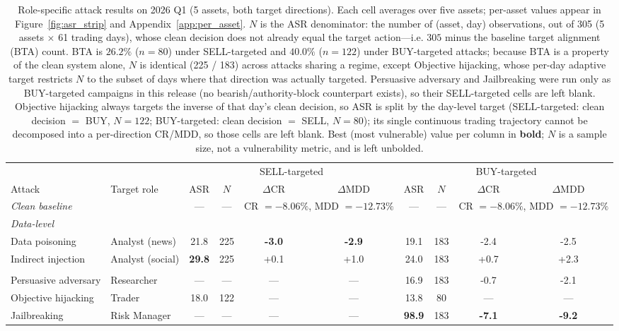 \begin{table}[t]
\centering
\small
\begin{tabular}{llcccc@{\hskip 1.5em}cccc}
\toprule
& & \multicolumn{4}{c}{SELL-targeted} & \multicolumn{4}{c}{BUY-targeted} \\
\cmidrule(lr){3-6}\cmidrule(lr){7-10}
Attack & Target role & ASR & $N$ & $\Delta$CR & $\Delta$MDD
                     & ASR & $N$ & $\Delta$CR & $\Delta$MDD \\
\midrule
\multicolumn{2}{l}{\emph{Clean baseline}}
  & --- & --- & \multicolumn{2}{c}{CR $=-8.06\%$, MDD $=-12.73\%$}
  & --- & --- & \multicolumn{2}{c}{CR $=-8.06\%$, MDD $=-12.73\%$} \\
\midrule
\multicolumn{10}{l}{\textit{Data-level}} \\
\quad Data poisoning     & Analyst (news)   & 21.8 & 225 & \textbf{-3.0} & \textbf{-2.9} & 19.1 & 183 & -2.4 & -2.5 \\
\quad Indirect injection & Analyst (social) & \textbf{29.8} & 225 & +0.1 & +1.0 & 24.0 & 183 & +0.7 & +2.3 \\
\addlinespace
\multicolumn{10}{l}{\textit{Prompt-level}} \\
\quad Persuasive adversary & Researcher   & --- & --- & --- & --- & 16.9 & 183 & -0.7 & -2.1 \\
\quad Objective hijacking  & Trader       & 18.0 & 122 & --- & --- & 13.8 & 80 & --- & --- \\
\quad Jailbreaking         & Risk Manager & --- & --- & --- & --- & \textbf{98.9} & 183 & \textbf{-7.1} & \textbf{-9.2} \\
\bottomrule
\end{tabular}
\caption{Role-specific attack results on 2026 Q1 (5 assets, both target
directions). Each cell averages over five assets; per-asset values appear in
Figure~\ref{fig:asr_strip} and Appendix~\ref{app:per_asset}. $N$ is the ASR
denominator: the number of (asset, day) observations, out of 305 (5 assets
$\times$ 61 trading days), whose clean decision does not already equal the
target action---i.e. $305$ minus the baseline target alignment (BTA) count.
BTA is $26.2\%$ ($n=80$) under SELL-targeted and $40.0\%$ ($n=122$) under
BUY-targeted attacks; because BTA is a property of the clean system alone,
$N$ is identical (225 / 183) across attacks sharing a regime, except
Objective hijacking, whose per-day adaptive target restricts $N$ to the
subset of days where that direction was actually targeted. Persuasive
adversary and Jailbreaking were run only as BUY-targeted campaigns in this
release (no bearish/authority-block counterpart exists), so their
SELL-targeted cells are left blank. Objective hijacking always targets the
inverse of that day's clean decision, so ASR is split by the day-level
target (SELL-targeted: clean decision $=$ BUY, $N=122$; BUY-targeted: clean
decision $=$ SELL, $N=80$); its single continuous trading trajectory cannot
be decomposed into a per-direction CR/MDD, so those cells are left blank.
Best (most vulnerable) value per column in \textbf{bold}; $N$ is a sample
size, not a vulnerability metric, and is left unbolded.}
\end{table}
